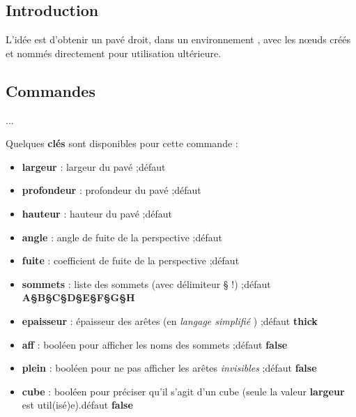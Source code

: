 \documentclass{article}
\newcommand\Cle[1]{{\bfseries\sffamily\textlangle #1\textrangle}}
\begin{document}
\subsection{Introduction}

\begin{codeidee}
L'idée est d'obtenir un pavé droit, dans un environnement \TikZ, avec les nœuds créés et nommés directement pour utilisation ultérieure.
\end{codeidee}

\subsection{Commandes}

\begin{codetex}
...
\end{codetex}

\begin{codecles}
Quelques \Cle{clés} sont disponibles pour cette commande :

\begin{itemize}
	\item \Cle{largeur} : largeur du pavé ;\hfill{}défaut \Cle{2}
	\item \Cle{profondeur} : profondeur du pavé ;\hfill{}défaut \Cle{1}
	\item \Cle{hauteur} : hauteur du pavé ;\hfill{}défaut \Cle{1.25}
	\item \Cle{angle} : angle de fuite de la perspective ;\hfill{}défaut \Cle{30}
	\item \Cle{fuite} : coefficient de fuite de la perspective ;\hfill{}défaut \Cle{0.5}
	\item \Cle{sommets} : liste des sommets (avec délimiteur § !) ;\hfill{}défaut \Cle{A§B§C§D§E§F§G§H}
	\item \Cle{epaisseur} : épaisseur des arêtes (en \textit{langage simplifié} \TikZ) ;\hfill{}défaut \Cle{thick}
	\item \Cle{aff} : booléen pour afficher les noms des sommets ;\hfill{}défaut \Cle{false}
	\item \Cle{plein} : booléen pour ne pas afficher les arêtes \textit{invisibles} ;\hfill{}défaut \Cle{false}
	\item \Cle{cube} : booléen pour préciser qu'il s'agit d'un cube (seule la valeur \Cle{largeur} est util(isé)e).\hfill{}défaut \Cle{false}
\end{itemize}
\end{codecles}
\end{document}
